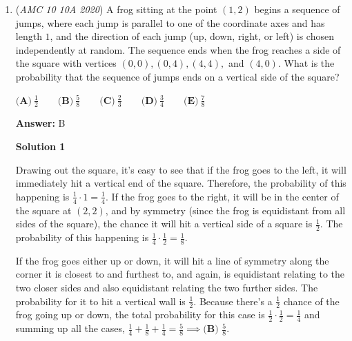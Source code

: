 \begin{enumerate}
 From this, we can deduce that $\textbf{(B)}$ cannot be true, since an incomplete part of $\triangle AMC$ is equal to it. We can also deduce that $\textbf{(D)}$ also cannot be true, since the unknown triangle $\triangle AUV = \triangle MUV$, and $\triangle MUV = \triangle CVC' < \triangle MVC'$. Therefore, the answer must be between $72$ and $144$, leaving $\boxed{\textbf{(C)}\ 96}$ as the only possible correct answer.

 Education, The Study of Everything

 


	\item (\textit{AMC 10 10A 2020}) A frog sitting at the point $(1, 2)$ begins a sequence of jumps, where each jump is parallel to one of the coordinate axes and has length $1$, and the direction of each jump (up, down, right, or left) is chosen independently at random. The sequence ends when the frog reaches a side of the square with vertices $(0,0), (0,4), (4,4),$ and $(4,0)$. What is the probability that the sequence of jumps ends on a vertical side of the square?


 $\textbf{(A)}\ \frac12\qquad\textbf{(B)}\ \frac 58\qquad\textbf{(C)}\ \frac 23\qquad\textbf{(D)}\ \frac34\qquad\textbf{(E)}\ \frac 78$

 \textbf{Answer: }B



\textbf{Solution 1}

Drawing out the square, it's easy to see that if the frog goes to the left, it will immediately hit a vertical end of the square. Therefore, the probability of this happening is $\frac{1}{4} \cdot 1 = \frac{1}{4}$. If the frog goes to the right, it will be in the center of the square at $(2,2)$, and by symmetry (since the frog is equidistant from all sides of the square), the chance it will hit a vertical side of a square is $\frac{1}{2}$. The probability of this happening is $\frac{1}{4} \cdot \frac{1}{2} = \frac{1}{8}$.

 
If the frog goes either up or down, it will hit a line of symmetry along the corner it is closest to and furthest to, and again, is equidistant relating to the two closer sides and also equidistant relating the two further sides. The probability for it to hit a vertical wall is $\frac{1}{2}$. Because there's a $\frac{1}{2}$ chance of the frog going up or down, the total probability for this case is $\frac{1}{2} \cdot \frac{1}{2} = \frac{1}{4}$ and summing up all the cases, $\frac{1}{4} + \frac{1}{8} + \frac{1}{4} = \frac{5}{8}       \implies \boxed{\textbf{(B) } \frac{5}{8}}$.


\end{enumerate}
